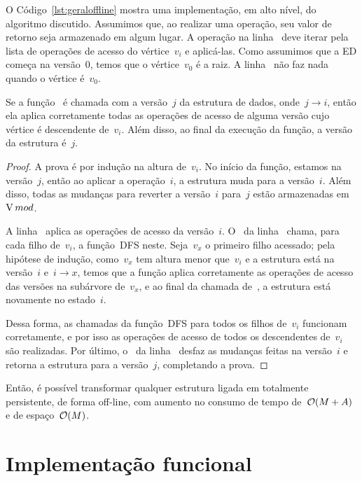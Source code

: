 \documentclass[main.tex]{subfiles}
\begin{document}
O Código~\ref{lst:geraloffline} mostra uma implementação, em alto nível, do algoritmo discutido. Assumimos que, ao realizar uma operação, seu valor de retorno seja armazenado em algum lugar. A operação na linha~ deve iterar pela lista de operações de acesso do vértice~$v_i$ e aplicá-las. Como assumimos que a ED começa na versão~0, temos que o vértice~$v_0$ é a raiz. A linha~ não faz nada quando o vértice é~$v_0$.

\begin{proposition}
	Se a função~{\normalfont {}} é chamada com a versão~$j$ da estrutura de dados, onde~${j \rightarrow i}$, então ela aplica corretamente todas as operações de acesso de alguma versão cujo vértice é descendente de~$v_i$. Além disso, ao final da execução da função, a versão da estrutura é~$j$.
\end{proposition}

\begin{proof}
A prova é por indução na altura de~$v_i$. No início da função, estamos na versão~$j$, então ao aplicar a operação~$i$, a estrutura muda para a versão~$i$. Além disso, todas as mudanças para reverter a versão~$i$ para~$j$ estão armazenadas em~$\operatorname{V}{mod}$.

A linha~ aplica as operações de acesso da versão~$i$. O~ da linha~ chama, para cada filho de~$v_i$, a função~\textsc{DFS} neste. Seja~$v_x$ o primeiro filho acessado; pela hipótese de indução, como~$v_x$ tem altura menor que~$v_i$ e a estrutura está na versão~$i$ e~${i \rightarrow x}$, temos que a função aplica corretamente as operações de acesso das versões na subárvore de~$v_x$, e ao final da chamada de~, a estrutura está novamente no estado~$i$.

Dessa forma, as chamadas da função~\textsc{DFS} para todos os filhos de~$v_i$ funcionam corretamente, e por isso as operações de acesso de todos os descendentes de~$v_i$ são realizadas. Por último, o~ da linha~ desfaz as mudanças feitas na versão~$i$ e retorna a estrutura para a versão~$j$, completando a prova.
\end{proof}

Então, é possível transformar qualquer estrutura ligada em totalmente persistente, de forma off-line, com aumento no consumo de tempo de~$\mathcal{O}(M+A)$ e de espaço~$\mathcal{O}(M)$.

\section{Implementação funcional} \label{sec:implfuncional}
\end{document}
